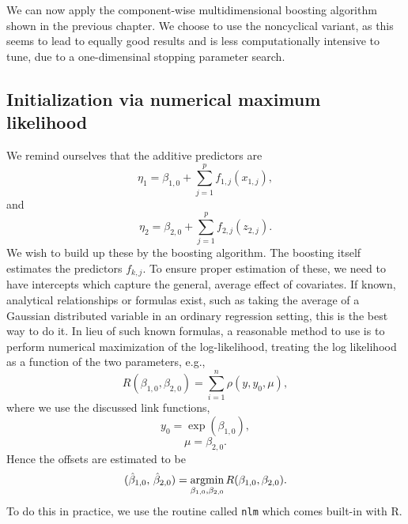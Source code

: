 We can now apply the component-wise multidimensional boosting algorithm shown in the previous chapter.
We choose to use the noncyclical variant, as this seems to lead to equally good results and is less computationally intensive to tune, due to a one-dimensinal stopping parameter search.

\subsection{Initialization via numerical maximum likelihood}
We remind ourselves that the additive predictors are
\begin{equation}
    \eta_1=\beta_{1,0}+\sum_{j=1}^p f_{1,j}(x_{1,j}),
\end{equation}
and
\begin{equation}
    \eta_2=\beta_{2,0}+\sum_{j=1}^p f_{2,j}(z_{2,j}).
\end{equation}
We wish to build up these by the boosting algorithm. The boosting itself estimates the predictors $f_{k,j}$.
To ensure proper estimation of these, we need to have intercepts which capture the general, average effect of covariates.
If known, analytical relationships or formulas exist, such as taking the average of a Gaussian distributed variable in an ordinary regression setting, this is the best way to do it.
In lieu of such known formulas, a reasonable method to use is to perform numerical maximization of the log-likelihood, treating the log likelihood as a function of the two parameters, e.g.,
\begin{equation}
    R(\beta_{1,0},\beta_{2,0})=\sum_{i=1}^n\rho(y,y_0,\mu),
\end{equation}
where we use the discussed link functions,
\begin{equation}
    y_0=\exp(\beta_{1,0}),
\end{equation}
\begin{equation}
    \mu=\beta_{2,0}.
\end{equation}
Hence the offsets are estimated to be
\begin{equation}
    (\hat{\beta}_{1,0},\,\hat{\beta}_{2,0})=\operatorname*{argmin}_{\beta_{1,0},\beta_{2,0}}R(\beta_{1,0},\beta_{2,0}).
\end{equation}
To do this in practice, we use the routine called \verb|nlm| which comes built-in with R.
